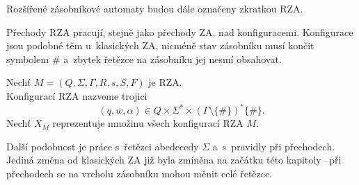 \begin{convention}
    Rozšířené zásobníkové automaty budou dále označeny zkratkou RZA.
\end{convention}

Přechody RZA pracují, stejně jako přechody ZA, nad konfiguracemi.
Konfigurace jsou podobné těm u~klasických ZA, nicméně stav zásobníku musí končit symbolem $\#$ a~zbytek řetězce na zásobníku jej nesmí obsahovat. 
\begin{definition}\label{def_konfigurace_za}
    Nechť $M = (Q, \Sigma, \Gamma, R, s, S, F)$ je RZA.\\
    Konfigurací RZA nazveme trojici
    \begin{equation*}
        (q, w, \alpha) \in Q \times \Sigma^* \times (\Gamma \setminus \{\#\})^*\{\#\}.
    \end{equation*}
    Nechť $X_M$ reprezentuje množinu všech konfigurací RZA $M$.
\end{definition}

Další podobnost je práce s~řetězci abedecedy $\Sigma$ a~s~pravidly při přechodech. 
Jediná změna od klasických ZA již byla zmíněna na začátku této kapitoly\,--\,při přechodech se na vrcholu zásobníku mohou měnit celé řetězce.

